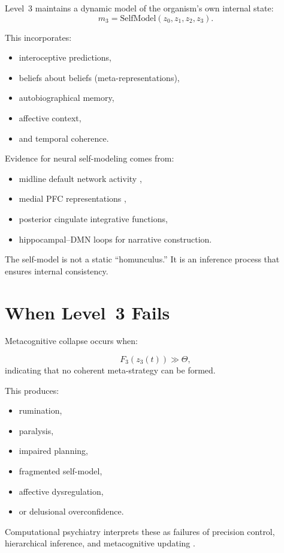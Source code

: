\documentclass[12pt,oneside]{book}
\theoremstyle{plain}
\theoremstyle{definition}
\let\citep\parencite
\begin{document}
Level~3 maintains a dynamic model of the organism’s own internal state:
\[
m_3 = \text{SelfModel}(z_0,z_1,z_2,z_3).
\]

This incorporates:

\begin{itemize}
  \item interoceptive predictions,
  \item beliefs about beliefs (meta-representations),
  \item autobiographical memory,
  \item affective context,
  \item and temporal coherence.
\end{itemize}

Evidence for neural self-modeling comes from:

\begin{itemize}
  \item midline default network activity \citep{buckner2008brain},
  \item medial PFC representations \citep{denny2012self},
  \item posterior cingulate integrative functions,
  \item hippocampal–DMN loops for narrative construction.
\end{itemize}

The self-model is not a static “homunculus.”
It is an inference process that ensures internal consistency.

\section{When Level~3 Fails}

Metacognitive collapse occurs when:

\[
F_3(z_3(t)) \gg \Theta,
\]
indicating that no coherent meta-strategy can be formed.

This produces:

\begin{itemize}
  \item rumination,
  \item paralysis,
  \item impaired planning,
  \item fragmented self-model,
  \item affective dysregulation,
  \item or delusional overconfidence.
\end{itemize}

Computational psychiatry interprets these as failures of precision control,
hierarchical inference, and metacognitive updating
\citep{friston2014computational,montague2012computational}.
\end{document}

